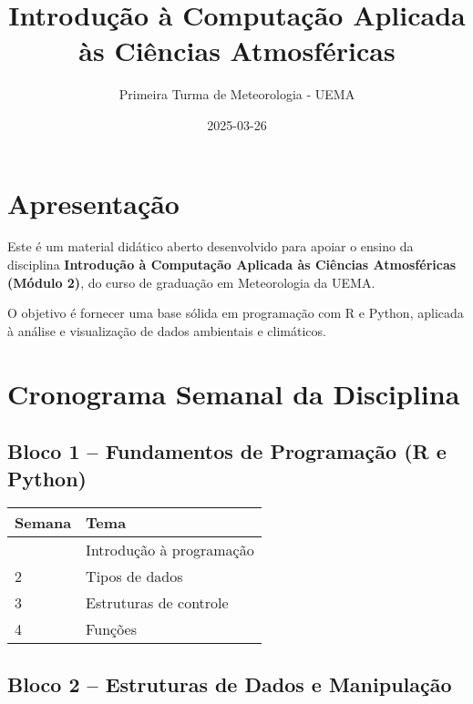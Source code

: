 \documentclass[
  letterpaper,
  DIV=11,
  numbers=noendperiod]{scrreprt}
\title{Introdução à Computação Aplicada às Ciências Atmosféricas}
\author{Primeira Turma de Meteorologia - UEMA}
\date{2025-03-26}
\renewcommand*\contentsname{Table of contents}
\newcommand\contentsname{Table of contents}
\begin{document}
\maketitle

\renewcommand*\contentsname{Table of contents}
{
\hypersetup{linkcolor=}
\setcounter{tocdepth}{2}
\tableofcontents
}


\chapter{Apresentação}\label{apresentauxe7uxe3o}

Este é um material didático aberto desenvolvido para apoiar o ensino da
disciplina \textbf{Introdução à Computação Aplicada às Ciências
Atmosféricas (Módulo 2)}, do curso de graduação em Meteorologia da UEMA.

O objetivo é fornecer uma base sólida em programação com R e Python,
aplicada à análise e visualização de dados ambientais e climáticos.


\chapter{Cronograma Semanal da
Disciplina}\label{cronograma-semanal-da-disciplina}

\section{Bloco 1 -- Fundamentos de Programação (R e
Python)}\label{bloco-1-fundamentos-de-programauxe7uxe3o-r-e-python}

\begin{longtable}[]{@{}ll@{}}
\toprule\noalign{}
Semana & Tema \\
\midrule\noalign{}
\endhead
\bottomrule\noalign{}
\endlastfoot
1 & Introdução à programação \\
2 & Tipos de dados \\
3 & Estruturas de controle \\
4 & Funções \\
\end{longtable}

\section{Bloco 2 -- Estruturas de Dados e
Manipulação}\label{bloco-2-estruturas-de-dados-e-manipulauxe7uxe3o}
\end{document}
